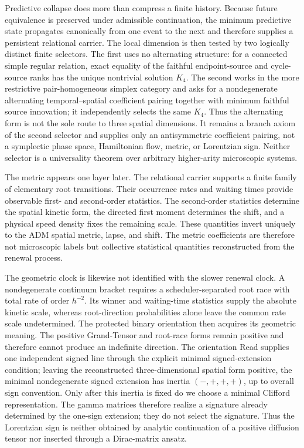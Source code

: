 \documentclass[11pt]{article}
\numberwithin{equation}{section}
\theoremstyle{definition}
\theoremstyle{remark}
\begin{document}
Predictive collapse does more than compress a finite history.  Because future
equivalence is preserved under admissible continuation, the minimum predictive
state propagates canonically from one event to the next and therefore supplies
a persistent relational carrier.  The local dimension is then tested by two
logically distinct finite selectors.  The first uses no alternating structure:
for a connected simple regular relation, exact equality of the faithful
endpoint-source and cycle-source ranks has the unique nontrivial solution
$K_4$.  The second works in the more restrictive pair-homogeneous simplex
category and asks for a nondegenerate alternating temporal--spatial coefficient
pairing together with minimum faithful source innovation; it independently
selects the same $K_4$.  Thus the alternating form is not the sole route to
three spatial dimensions.  It remains a branch axiom of the second selector
and supplies only an antisymmetric coefficient pairing, not a symplectic phase
space, Hamiltonian flow, metric, or Lorentzian sign.  Neither selector is a
universality theorem over arbitrary higher-arity microscopic systems.

The metric appears one layer later.  The relational carrier supports a finite
family of elementary root transitions.  Their occurrence rates and waiting
times provide observable first- and second-order statistics.  The second-order
statistics determine the spatial kinetic form, the directed first moment
determines the shift, and a physical speed density fixes the remaining scale.
These quantities invert uniquely to the ADM spatial metric, lapse, and shift.
The metric coefficients are therefore not microscopic labels but collective
statistical quantities reconstructed from the renewal process.

The geometric clock is likewise not identified with the slower renewal clock.
A nondegenerate continuum bracket requires a scheduler-separated root race
with total rate of order $h^{-2}$.  Its winner and waiting-time statistics
supply the absolute kinetic scale, whereas root-direction probabilities alone
leave the common rate scale undetermined.  The protected binary orientation then acquires its geometric meaning.  The
positive Grand-Tensor and root-race forms remain positive and therefore cannot
produce an indefinite direction.  The orientation Read supplies one independent signed line through the explicit minimal signed-extension
condition; leaving the reconstructed three-dimensional spatial form positive, the minimal nondegenerate signed extension has inertia
$(-,+,+,+)$, up to overall sign convention.  Only after this inertia is fixed
do we choose a minimal Clifford representation.  The gamma matrices therefore
realize a signature already determined by the one-sign extension; they do not
select the signature.  Thus the Lorentzian sign is neither obtained by analytic
continuation of a positive diffusion tensor nor inserted through a Dirac-matrix
ansatz.
\end{document}
